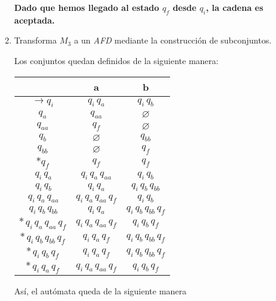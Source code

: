 \documentclass{article}
\begin{document}
\begin{enumerate}
\begin{enumerate}
        \textbf{Dado que hemos llegado al estado $q_f$ desde $q_i$, la cadena es aceptada.}
        
        \newpage
        \item Transforma $M_3$ a un \textit{AFD} mediante la construcción de subconjuntos.
        
        Los conjuntos quedan definidos de la siguiente manera:
        
        \begin{table}[h]
        \centering
        \begin{tabular}{c|c|c}
        \hline
         & a & b \\
        \hline
        $\rightarrow q_i$ & $q_i\,q_a$ & $q_i\,q_b$ \\
        $q_a$             & $q_{aa}$   & $\varnothing$ \\
        $q_{aa}$          & $q_f$      & $\varnothing$ \\
        $q_b$             & $\varnothing$ & $q_{bb}$ \\
        $q_{bb}$          & $\varnothing$ & $q_f$ \\
        $*q_f$             & $q_f$      & $q_f$ \\
        \hline
        $\,q_i\,q_a$     & $q_i\,q_a\,q_{aa}$ & $q_i\,q_b$ \\
        $\,q_i\,q_b$     & $q_i\,q_a$         & $q_i\,q_b\,q_{bb}$ \\
        $\,q_i\,q_a\,q_{aa}$ & $q_i\,q_a\,q_{aa}\,q_f$ & $q_i\,q_b$ \\
        $\,q_i\,q_b\,q_{bb}$ & $q_i\,q_a$         & $q_i\,q_b\,q_{bb}\,q_f$ \\
        $*\,q_i\,q_a\,q_{aa}\,q_f$    & $q_i\,q_a\,q_{aa}\,q_f$      & $q_i\,q_b\,q_f$ \\
        $*\,q_i\,q_b\,q_{bb}\,q_f$ & $q_i\,q_a\,q_f$ & $q_i\,q_b\,q_{bb}\,q_f$ \\
        $*\,q_i\,q_b\,q_f$ & $q_i\,q_a\,q_f$         & $q_i\,q_b\,q_{bb}\,q_f$ \\
        $*\,q_i\,q_a\,q_f$ & $q_i\,q_a\,q_{aa}\,q_f$         & $q_i\,q_b\,q_f$ \\
        \hline
        \end{tabular}
        \end{table}

        Así, el autómata queda de la siguiente manera
        \begin{center}
\end{center}
\end{enumerate}
\end{enumerate}
\end{document}
